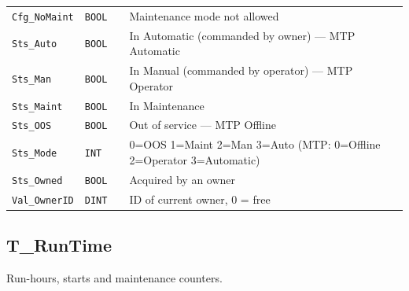 \begin{small}
\begin{longtable}{@{}P{3.70cm}P{2.20cm}P{1.70cm}P{8.91cm}@{}}
\texttt{Cfg\_NoMaint} & \texttt{BOOL} &  & Maintenance mode not allowed \\
\texttt{Sts\_Auto} & \texttt{BOOL} &  & In Automatic (commanded by owner) --- MTP Automatic \\
\texttt{Sts\_Man} & \texttt{BOOL} &  & In Manual (commanded by operator) --- MTP Operator \\
\texttt{Sts\_Maint} & \texttt{BOOL} &  & In Maintenance \\
\texttt{Sts\_OOS} & \texttt{BOOL} &  & Out of service --- MTP Offline \\
\texttt{Sts\_Mode} & \texttt{INT} &  & 0=OOS 1=Maint 2=Man 3=Auto  (MTP: 0=Offline 2=Operator 3=Automatic) \\
\texttt{Sts\_Owned} & \texttt{BOOL} &  & Acquired by an owner \\
\texttt{Val\_OwnerID} & \texttt{DINT} &  & ID of current owner, 0 = free \\
\bottomrule
\end{longtable}
\end{small}

\subsection{T\_RunTime}\label{sec:pclib-t-runtime}

Run-hours, starts and maintenance counters.

\par{}\par

